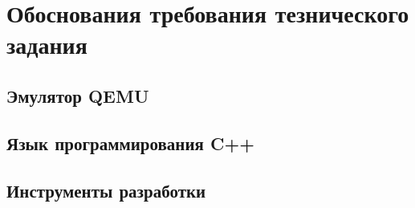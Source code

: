 \section{Обоснования требования тезнического задания}



\subsection{Эмулятор QEMU}
\subsection{Язык программирования C++}
\subsection{Инструменты разработки}

\newpage
